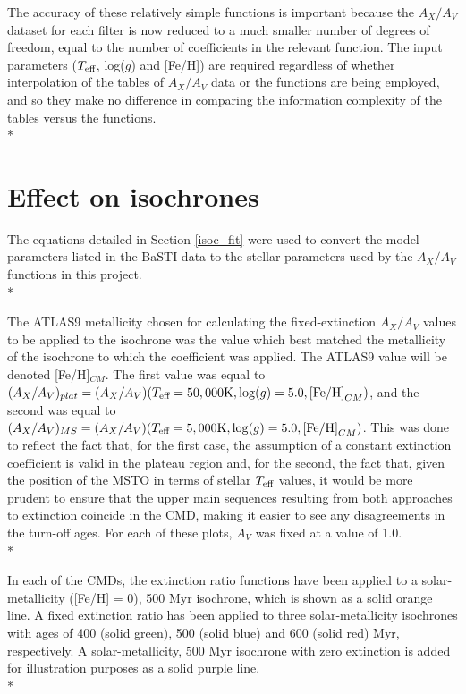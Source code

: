 \documentclass[12pt, a4paper]{report}
\begin{document}
The accuracy of these relatively simple functions is important because the $A_{X}/A_{V}$ dataset for each filter is now reduced to a much smaller number of degrees of freedom, equal to the number of coefficients in the relevant function. The input parameters ($T_{\textnormal{eff}}$, log($g$) and [Fe/H]) are required regardless of whether interpolation of the tables of $A_{X}/A_{V}$ data or the functions are being employed, and so they make no difference in comparing the information complexity of the tables versus the functions.\\*


\section{Effect on isochrones} \label{result_CMDs}
The equations detailed in Section \ref{isoc_fit} were used to convert the model parameters listed in the BaSTI data to the stellar parameters used by the $A_{X}/A_{V}$ functions in this project. \\*

The ATLAS9 metallicity chosen for calculating the fixed-extinction $A_{X}/A_{V}$ values to be applied to the isochrone was the value which best matched the metallicity of the isochrone to which the coefficient was applied. The ATLAS9 value will be denoted [Fe/H]$_{CM}$. The first value was equal to $(A_{X}/A_{V})_{plat} = (A_{X}/A_{V})(T_{\textnormal{eff}} = 50,000\textnormal{K},\log(g) = 5.0,\textnormal{[Fe/H]}_{CM})$, and the second was equal to $(A_{X}/A_{V})_{MS} = (A_{X}/A_{V})(T_{\textnormal{eff}} = 5,000\textnormal{K},\log(g) = 5.0,\textnormal{[Fe/H]}_{CM})$. This was done to reflect the fact that, for the first case, the assumption of a constant extinction coefficient is valid in the plateau region and, for the second, the fact that, given the position of the MSTO in terms of stellar $T_{\textnormal{eff}}$ values, it would be more prudent to ensure that the upper main sequences resulting from both approaches to extinction coincide in the CMD, making it easier to see any disagreements in the turn-off ages. For each of these plots, $A_{V}$ was fixed at a value of 1.0.\\*

In each of the CMDs, the extinction ratio functions have been applied to a solar-metallicity ([Fe/H] = 0), 500 Myr isochrone, which is shown as a solid orange line. A fixed extinction ratio has been applied to three solar-metallicity isochrones with ages of 400 (solid green), 500 (solid blue) and 600 (solid red) Myr, respectively. A solar-metallicity, 500 Myr isochrone with zero extinction is added for illustration purposes as a solid purple line.\\*
\end{document}
